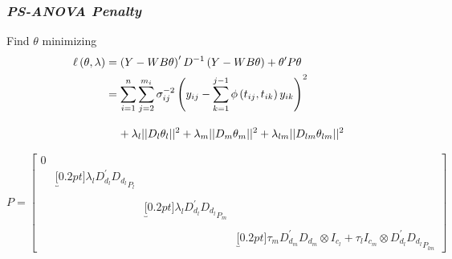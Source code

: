 \documentclass[12pt]{beamer}
\newcommand{\ms}{\scriptscriptstyle}
\begin{document}
\begin{frame}
\frametitle{\emph{PS-ANOVA Penalty}}


Find $\theta$ minimizing
\begin{align}
\begin{split} \label{eq:PS-ANOVA}
\ell\left(\theta,\lambda\right) &= \left(Y-WB\theta\right)^\prime D^{-1}\left(Y-WB\theta\right) + \theta^\prime P \theta\\
&= \sum_{i=1}^n \sum_{j=2}^{m_i} \sigma_{ij}^{-2} \left(y_{ij} - \sum_{k=1}^{j-1}\phi\left({t_{ij},t_{ik}}\right)y_{ik} \right)^2 \\[2ex]
&\mbox{\;\;\;\;}+ \lambda_l\vert \vert D_l\theta_l \vert \vert^2 + \lambda_m\vert \vert D_m\theta_m \vert \vert^2+ \lambda_{lm}\vert \vert D_{lm}\theta_{lm} \vert \vert^2
\end{split}
\end{align}

\begin{equation*}
P  = \begin{bmatrix}
0 &&&\\
& \underbracket[0.2pt]{\lambda_l D_{\ms{d_l}}^\prime D_{\ms{d_l}}}_{\text{$P_{\ms l}$}}	& 	& \\
&&& \\
&	&	\underbracket[0.2pt]{\lambda_l D_{\ms{d_l}}^\prime D_{\ms{d_l}}}_{\text{$P_{\ms m}$}}	& 	\\
&&&\\
&&&	\underbracket[0.2pt]{\tau_m D_{\ms{d_m}}^\prime D_{\ms{d_m}} \otimes I_{\ms{c_l}} + \tau_l I_{\ms{c_m}} \otimes D_{\ms{d_l}}^\prime D_{\ms{d_l}}}_{\text{$P_{\ms lm}$}}
\end{bmatrix}
\end{equation*}


\end{frame}








\end{document}
